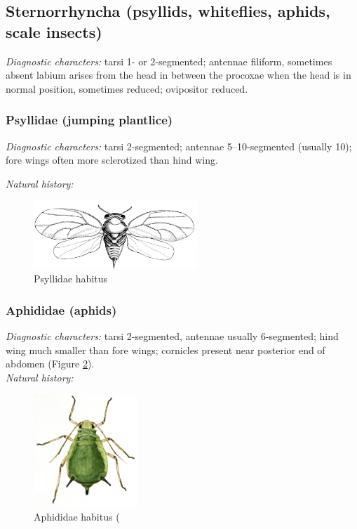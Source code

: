 \documentclass[letterpaper, 11pt]{article}
\begin{document}
\subsection{Sternorrhyncha (psyllids, whiteflies, aphids, scale insects)}
\noindent{}\textit{Diagnostic characters:} tarsi 1- or 2-segmented; antennae filiform, sometimes absent labium arises from the head in between the procoxae when the head is in normal position, sometimes reduced; ovipositor reduced.\\

\subsubsection{Psyllidae (jumping plantlice)}
\noindent{}\textit{Diagnostic characters:} tarsi 2-segmented; antennae 5--10-segmented (usually 10); fore wings often more sclerotized than hind wing.

\noindent{}\textit{Natural history:} \\

\begin{figure}[ht!]
 \centering
 \includegraphics[width=0.55\textwidth]{PsyllidHabitus}
 \caption{Psyllidae habitus \citep[][Fig. 10d]{bhlpart17516}}
 \label{fig:psyllid}
\end{figure}

\subsubsection{Aphididae (aphids)}
\noindent{}\textit{Diagnostic characters:} tarsi 2-segmented, antennae usually 6-segmented; hind wing much smaller than fore wings; cornicles present near posterior end of abdomen (Figure \ref{fig:aphid1}).\\

\noindent{}\textit{Natural history:} \\

\begin{figure}[ht!]
 \centering
 \includegraphics[width=0.35\textwidth]{AphididHabitus}
 \caption{Aphididae habitus (\citep[][Plate IIA]{bhl128276}}
 \label{fig:aphid1}
\end{figure}
\end{document}
